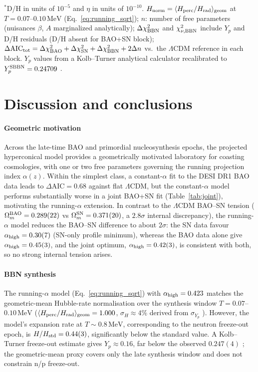 ﻿\documentclass[3p,twocolumn]{elsarticle}
\begin{document}
\begin{table}[htbp]
{\footnotesize $^*$D/H in units of $10^{-5}$ and $\eta$ in units of $10^{-10}$. $H_\mathrm{norm}=\langle H_{\rm perc}/H_{\rm rad}\rangle_{\rm geom}$ at $T=0.07$--$0.10\,\mathrm{MeV}$ (Eq.~\ref{eq:running_sqrt}); $n$: number of free parameters (nuisances $\beta$, $A$ marginalized analytically); $\Delta\chi^2_{\rm BBN}$ and $\chi^2_{\nu,\rm BBN}$ include $Y_p$ and D/H residuals (D/H absent for BAO+SN block); $\Delta\mathrm{AIC}_{\rm tot}=\Delta\chi^2_{\rm BAO}+\Delta\chi^2_{\rm SN}+\Delta\chi^2_{\rm BBN}+2\Delta n$ vs.\ the $\Lambda$CDM reference in each block. $Y_p$ values from a Kolb--Turner analytical calculator \cite{kolbturner1990} recalibrated to $Y_p^{\rm SBBN}=0.24709$ \cite{fields2020bbn}.}
\end{table}

\section{Discussion and conclusions}\label{sec:discussion}

\paragraph{Geometric motivation} Across the late-time BAO and primordial nucleosynthesis epochs, the projected hyperconical model provides a geometrically motivated laboratory for coasting cosmologies, with one or two free parameters governing the running projection index $\alpha(z)$. Within the simplest class, a constant-$\alpha$ fit to the DESI DR1 BAO data leads to $\Delta\mathrm{AIC}=0.68$ against flat $\Lambda$CDM, but the constant-$\alpha$ model performs substantially worse in a joint BAO+SN fit (Table~\ref{tab:joint}), motivating the running-$\alpha$ extension. In contrast to the $\Lambda$CDM BAO--SN tension ($\Omega_m^{\rm BAO}=0.289(22)$ vs $\Omega_m^{\rm SN}=0.371(20)$, a $2.8\sigma$ internal discrepancy), the running-$\alpha$ model reduces the BAO--SN difference to about $2\sigma$: the SN data favour $\alpha_{\rm high}=0.30(7)$ (SN-only profile minimum), whereas the BAO data alone give $\alpha_{\rm high}=0.45(3)$, and the joint optimum, $\alpha_{\rm high}=0.42(3)$, is consistent with both, so no strong internal tension arises.

\paragraph{BBN synthesis} The running-$\alpha$ model (Eq.~\ref{eq:running_sqrt}) with $\alpha_{\rm high}=0.423$ matches the geometric-mean Hubble-rate normalisation over the synthesis window $T=0.07$--$0.10\,\mathrm{MeV}$ ($\langle H_{\rm perc}/H_{\rm rad}\rangle_{\rm geom}=1.000$, $\sigma_H\approx4\%$ derived from $\sigma_{Y_p}$ \cite{Aver2021,kolbturner1990}). However, the model's expansion rate at $T\sim0.8\,\mathrm{MeV}$, corresponding to the neutron freeze-out epoch, is $H/H_{\rm std} = 0.44(3)$, significantly below the standard value. A Kolb--Turner freeze-out estimate \cite{kolbturner1990} gives $Y_p\approx0.16$, far below the observed $0.247(4)$ \cite{Aver2021}; the geometric-mean proxy covers only the late synthesis window and does not constrain n/p freeze-out.
\end{document}
